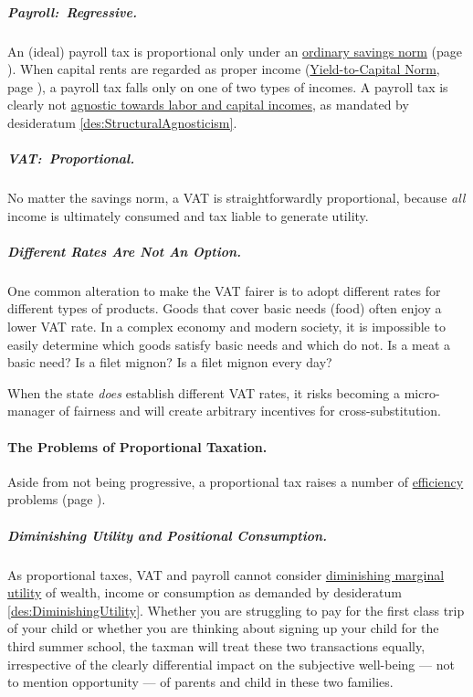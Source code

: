 \subparagraph{Payroll:~Regressive.}
An (ideal) payroll tax is proportional only under an \hyperref[sec:OSN]{ordinary savings norm} (page \pageref{sec:OSN}).
When capital rents are regarded as proper income (\hyperref[sec:Y2C]{Yield-to-Capital Norm}, page \pageref{sec:Y2C}), a payroll tax falls only on one of two types of incomes.
A payroll tax is clearly not \hyperref[des:StructuralAgnosticism]{agnostic towards labor and capital incomes}, as mandated by desideratum \ref{des:StructuralAgnosticism}.

\subparagraph{VAT:~Proportional.}
No matter the savings norm, a VAT is straightforwardly proportional, because \emph{all} income is ultimately consumed and tax liable to generate utility.

\subparagraph{Different Rates Are Not An Option.}
One common alteration to make the VAT fairer is to adopt different rates for different types of products.
Goods that cover basic needs (food) often enjoy a lower VAT rate.
In a complex economy and modern society, it is impossible to easily determine which goods satisfy basic needs and which do not.
Is a meat a basic need?
Is a filet mignon?
Is a filet mignon every day?

When the state \emph{does} establish different VAT rates, it risks becoming a micro-manager of fairness and will create arbitrary incentives for cross-substitution.

\paragraph{The Problems of Proportional Taxation.}
Aside from not being progressive, a proportional tax raises a number of \hyperref[sec:Efficiency]{efficiency} problems (page \pageref{sec:Efficiency}).

\subparagraph{Diminishing Utility and Positional Consumption.}
As proportional taxes, VAT and payroll cannot consider \hyperref[des:DiminishingUtility]{diminishing marginal utility} of wealth, income or consumption as demanded by desideratum \ref{des:DiminishingUtility}.
Whether you are struggling to pay for the first class trip of your child or whether you are thinking about signing up your child for the third summer school, the taxman will treat these two transactions equally, irrespective of the clearly differential impact on the subjective well-being --- not to mention opportunity --- of parents and child in these two families.


